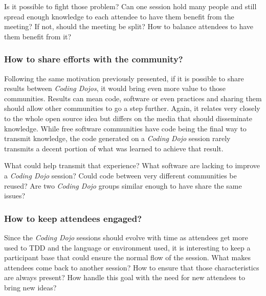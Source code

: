 Is it possible to fight those problem? Can one session hold many
people and still spread enough knowledge to each attendee to have them
benefit from the meeting? If not, should the meeting be split? How
to balance attendees to have them benefit from it?

\subsubsection{How to share efforts with the community?}

Following the same motivation previously presented, if it is possible
to share results between \textit{Coding Dojos}, it would bring even
more value to those communities. Results can mean code, software or
even practices and sharing them should allow other communities to go a
step further. Again, it relates very closely to the whole open source
idea but differs on the media that should disseminate knowledge. While
free software communities have code being the final way to transmit
knowledge, the code generated on a \textit{Coding Dojo} session rarely
transmits a decent portion of what was learned to achieve that result.

What could help transmit that experience? What software are lacking to
improve a \textit{Coding Dojo} session? Could code between very
different communities be reused? Are two \textit{Coding Dojo} groups
similar enough to have share the same issues?

\subsubsection{How to keep attendees engaged?}

Since the \textit{Coding Dojo} sessions should evolve with time as
attendees get more used to TDD and the language or environment used,
it is interesting to keep a participant base that could ensure the
normal flow of the session. What makes attendees come back to another
session? How to ensure that those characteristics are always present?
How handle this goal with the need for new attendees to bring new
ideas?

